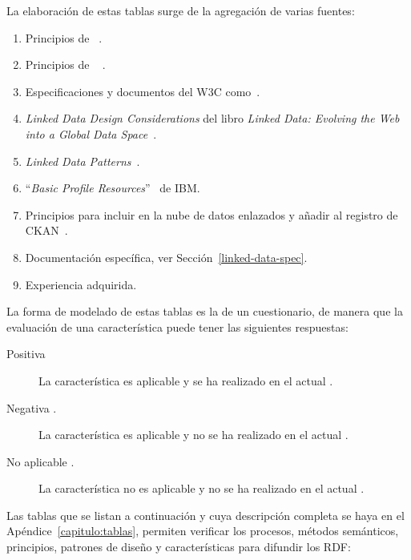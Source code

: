 La elaboración de estas tablas surge de la agregación de varias fuentes:
\begin{enumerate}
 \item Principios de \linkeddata~\cite{Berners-Lee-2006}.
 \item Principios de \opendata~\cite{okfn} . 
 \item Especificaciones y documentos del \gls{W3C} como~\cite{publishing-ogd,linked-data-cookbook,Berr08}. 
 \item \textit{Linked Data Design Considerations} del libro \textit{Linked Data: Evolving the Web into a Global Data Space}~\cite{Heath_Bizer_2011}.
 \item \textit{Linked Data Patterns}~\cite{linked-data-patterns}.
 \item ``\textit{Basic Profile Resources}''~\cite{basic-profile-ibm} de IBM.
 \item Principios para incluir \datasets en la nube de datos enlazados y añadir al registro de \gls{CKAN}~\cite{ckanValidator}.
 \item Documentación específica, ver Sección~\ref{linked-data-spec}.
 \item Experiencia adquirida.
\end{enumerate}

La forma de modelado de estas tablas es la de un cuestionario, de manera que la evaluación de una característica 
puede tener las siguientes respuestas:
\begin{description}
 \item [Positiva \si.] La característica es aplicable y se ha realizado en el actual \dataset.
 \item [Negativa \no.] La característica es aplicable y no se ha realizado en el actual \dataset.
 \item [No aplicable \na.] La característica no es aplicable y no se ha realizado en el actual \dataset.
\end{description}

Las tablas que se listan a continuación y cuya descripción completa se haya en el Apéndice~\ref{capitulo:tablas}, permiten verificar los 
procesos, métodos semánticos, principios, patrones de diseño y características para difundir los \datasets \gls{RDF}:

